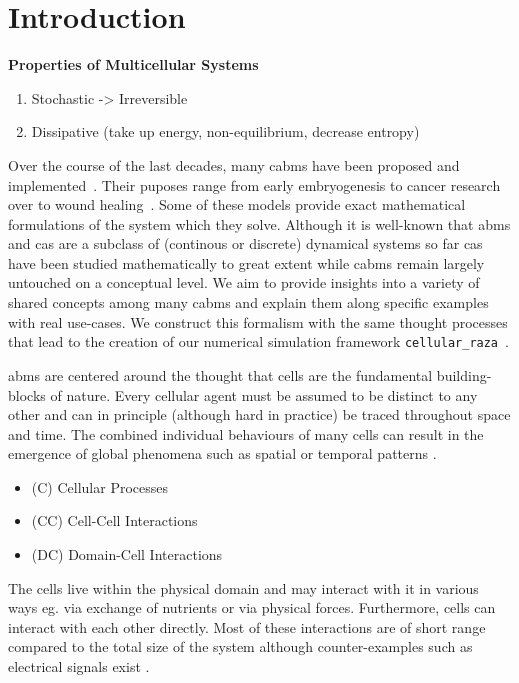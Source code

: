 \section{Introduction}

\textbf{Properties of Multicellular Systems}
\begin{enumerate}
    \item Stochastic -> Irreversible
    \item Dissipative (take up energy, non-equilibrium, decrease entropy)
\end{enumerate}

Over the course of the last decades, many \acp{cabm} have been proposed and
implemented~\cite{Pleyer2023}.
Their puposes range from early embryogenesis to cancer research over to wound
healing~\cite{Ziraldo2013}.
Some of these models provide exact mathematical formulations \cite{Ghaffarizadeh2018,Tanaka2015} of
the system which they solve.
Although it is well-known that \acp{abm} and \acp{ca} are a subclass of (continous or discrete)
dynamical systems \cite{Wolfram1984} so far \acp{ca} have been studied mathematically to great
extent while \acp{cabm} remain largely untouched on a conceptual level.
We aim to provide insights into a variety of shared concepts among many \acp{cabm} and explain them
along specific examples with real use-cases.
We construct this formalism with the same thought processes that lead to the creation of our
numerical simulation framework \lstinline{cellular_raza}~\cite{Pleyer_cellular_raza_2024}.

\acp{abm} are centered around the thought that cells are the fundamental building-blocks of nature.
Every cellular agent must be assumed to be distinct to any other and can in principle (although hard
in practice) be traced throughout space and time.
The combined individual behaviours of many cells can result in the emergence of global phenomena
such as spatial or temporal patterns \cite{Owen2020,Wolpert1969,Giudicelli2007}.

\begin{itemize}
    \item (C) Cellular Processes
    \item (CC) Cell-Cell Interactions
    \item (DC) Domain-Cell Interactions
\end{itemize}

The cells live within the physical domain and may interact with it in various ways eg. via exchange
of nutrients or via physical forces.
Furthermore, cells can interact with each other directly.
Most of these interactions are of short range compared to the total size of the system although
counter-examples such as electrical signals exist \cite{Ded2021}.

